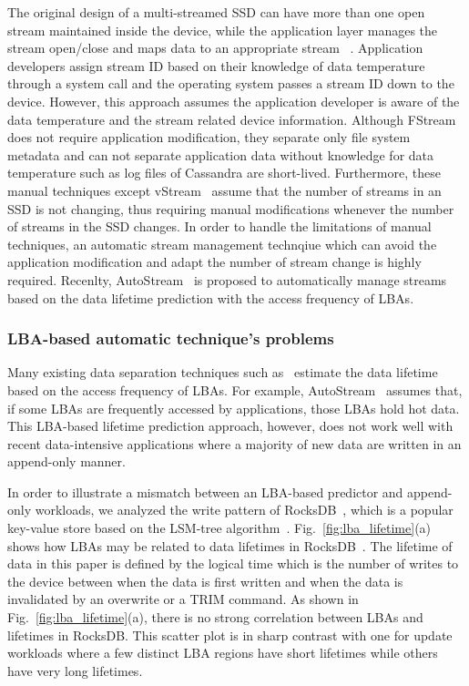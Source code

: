 The original design of a multi-streamed SSD can have more
than one open stream maintained inside the device, while the
application layer manages the stream open/close and maps data to an appropriate stream
~\cite{MultiStream, Level, vStream}.
Application developers assign stream ID based on their knowledge of
data temperature through a system call and the operating
system passes a stream ID down to the device. However,
this approach assumes the application developer is aware of the data
temperature and the stream related device information. 
Although \textsf{\small FStream}~\cite{FStream} does not require application modification,
they separate only file system metadata and can not separate application data without 
knowledge for data temperature such as log files of Cassandra are short-lived.
Furthermore, these manual techniques except \textsf{\small vStream}~\cite{vStream} assume 
that the number of streams in an SSD is not changing, 
thus requiring manual modifications whenever the number of streams in the SSD changes.
In order to handle the limitations of manual techniques, an automatic stream management
technqiue which can avoid the application modification and adapt the number of stream change
is highly required.
Recenlty, AutoStream~\cite{AutoStream} is proposed to automatically manage streams 
based on the data lifetime prediction with the access frequency of LBAs.

\subsubsection{LBA-based automatic technique's problems}
Many existing data separation techniques such as~\cite{HotCold, AutoStream} 
estimate the data lifetime based on the access frequency of LBAs.  
For example, \textsf{\small AutoStream}~\cite{AutoStream} assumes that, if
some LBAs are frequently accessed by applications, those LBAs hold hot data.
This LBA-based lifetime prediction 
approach, however, does not work well with recent data-intensive 
applications where a majority of
new data are written in an append-only manner.  

In order to illustrate a mismatch between an LBA-based predictor and 
append-only workloads, we analyzed the write pattern of 
RocksDB~\cite{RocksDB}, which is a
popular key-value store based on the LSM-tree algorithm~\cite{LSM}.
Fig.~\ref{fig:lba_lifetime}(a) shows how LBAs may be related 
to data lifetimes in RocksDB~\cite{RocksDB}.  
The lifetime of data in this paper is defined 
by the logical time which is the number of writes to the device 
between when the data is first written 
and when the data is invalidated by an overwrite or a TRIM command.
As shown in Fig.~\ref{fig:lba_lifetime}(a), 
there is no strong correlation between LBAs and lifetimes in RocksDB.  
This scatter plot is in sharp contrast with one for update workloads 
where a few distinct LBA regions have short lifetimes while others 
have very long lifetimes.

